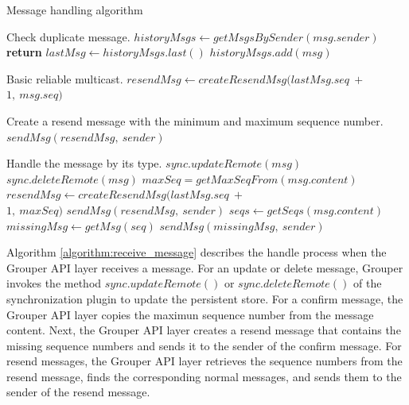 \documentclass[a4paper,11pt]{report}
\begin{document}
\begin{algorithm}[t]
	\caption{Message handling algorithm}\label{alg:euclid}
	\begin{algorithmic}[1]		
		\LeftComment Check duplicate message.
		\State  $historyMsgs \gets getMsgsBySender(msg.sender)$
		\State \textbf{return}
		\EndIf
		\State $lastMsg \gets historyMsgs.last()$
		\State $historyMsgs.add(msg)$
		
		\LeftComment Basic reliable multicast.
		\State $resendMsg \gets createResendMsg(lastMsg.seq\ +\ $ \\\hspace{2.7cm} $1,\ msg.seq)$
		
		\Comment Create a resend message with the minimum and maximum sequence number.
		\State $sendMsg(resendMsg,\ sender)$
		\EndIf
		
		\LeftComment Handle the message by its type.
		\State $sync.updateRemote(msg)$
		\State $sync.deleteRemote(msg)$
		\State $maxSeq = getMaxSeqFrom(msg.content)$
		\State $resendMsg \gets createResendMsg(lastMsg.seq\ +\ $ \\\hspace{2.7cm}  $1,\ maxSeq)$
		\State $sendMsg(resendMsg,\ sender)$
		\EndIf
		\State $seqs \gets getSeqs(msg.content)$
		\State $missingMsg \gets getMsg(seq)$
		\State $sendMsg(missingMsg,\ sender)$
		\EndFor
		\EndIf
		\EndProcedure
	\end{algorithmic}
	\label{algorithm:receive_message}
\end{algorithm}

Algorithm \ref{algorithm:receive_message} describes the handle process when the Grouper API layer receives a message.
For an update or delete message, Grouper invokes the method $sync.updateRemote()$ or $sync.deleteRemote()$ of the synchronization plugin to update the persistent store.
For a confirm message, the Grouper API layer copies the maximun sequence number from the message content.
Next, the Grouper API layer creates a resend message that contains the missing sequence numbers and sends it to the sender of the confirm message.
For resend messages, the Grouper API layer retrieves the sequence numbers from the resend message, finds the corresponding normal messages, and sends them to the sender of the resend message.
\end{document}
